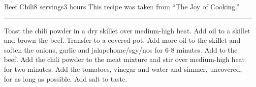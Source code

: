 \begin{recipe}{Beef Chili}{8 servings}{3 hours}
\freeform This recipe was taken from ``The Joy of Cooking.''\\
\rule{\textwidth}{0.05pt}
Toast the chili powder in a dry skillet over medium-high heat.
Add oil to a skillet and brown the beef.  Transfer to a covered pot. 
Add more oil to the skillet and soften the onions, garlic and jalape\/home/sgy/{n}os for 6-8 minutes.  Add to the beef.
\newstep
Add the chili powder to the meat mixture and stir over medium-high heat for two minutes.
Add the tomatoes, vinegar and water and simmer, uncovered, for as long as possible.  Add salt to taste.
\end{recipe}
